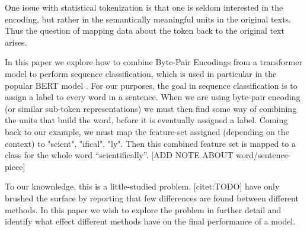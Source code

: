 \documentclass[11pt]{article}
\begin{document}
            One issue with statistical tokenization is that one is
     seldom interested in the encoding, but rather in the semantically
     meaningful units in the original texts. Thus the question of
     mapping data about the token back to the original text arises.
        
    	In this paper we explore how to combine Byte-Pair Encodings
     from a transformer model to perform sequence classification,
     which is used in particular in the popular BERT model
     \cite{devlin2018bert}. For our purposes, the goal in sequence
     classification is to assign a label to every word in a
     sentence. When we are using byte-pair encoding (or similar
     sub-token representations) we must then find some way of
     combining the units that build the word, before it is eventually
     assigned a label. Coming back to our example, we must map the
     feature-set assigned (depending on the context) to "scient",
     "ifical", "ly". Then this combined feature set is mapped to a
     class for the whole word ``scientifically''. [ADD NOTE ABOUT word/sentence-piece]

    	To our knownledge, this is a little-studied
     problem. [citet:TODO] have only brushed the surface by reporting
     that few differences are found between different methods. In this
     paper we wish to explore the problem in further detail and
     identify what effect different methods have on the final
     performance of a model.

    
	
    
\end{document}
